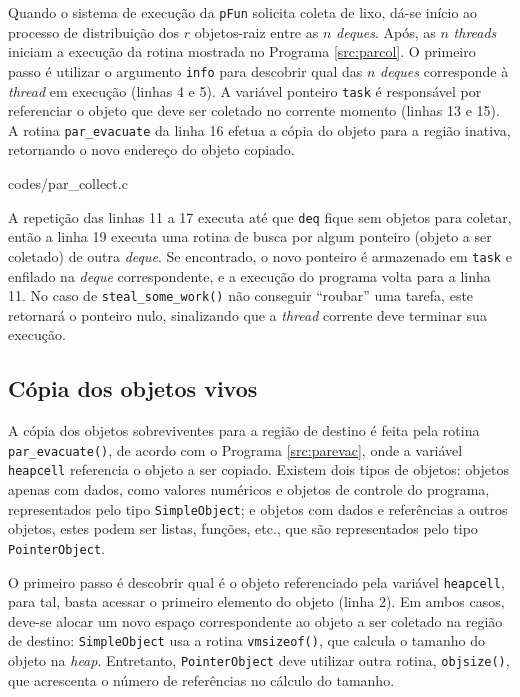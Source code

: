 \documentclass[ccc, pg2]{esinucpel}
\begin{document}
Quando o sistema de execução da {\tt pFun} solicita coleta de lixo, dá-se início ao processo de distribuição dos $r$ objetos-raiz entre as $n$ {\it deques}. Após, as $n$ {\it threads} iniciam a execução da rotina mostrada no Programa \ref{src:parcol}. O primeiro passo é utilizar o argumento {\tt info} para descobrir qual das $n$ {\it deques} corresponde à {\it thread} em execução (linhas 4 e 5). A variável ponteiro {\tt task} é responsável por referenciar o objeto que deve ser coletado no corrente momento (linhas 13 e 15). A rotina {\tt par\_evacuate} da linha 16 efetua a cópia do objeto para a região inativa, retornando o novo endereço do objeto copiado.


								 {codes/par_collect.c}

A repetição das linhas 11 a 17 executa até que {\tt deq} fique sem objetos para coletar, então a linha 19 executa uma rotina de busca por algum ponteiro (objeto a ser coletado) de outra {\it deque}. Se encontrado, o novo ponteiro é armazenado em {\tt task} e enfilado na {\it deque} correspondente, e a execução do programa volta para a linha 11. No caso de {\tt steal\_some\_work()} não conseguir ``roubar'' uma tarefa, este retornará o ponteiro nulo, sinalizando que a {\it thread} corrente deve terminar sua execução.


\subsection{Cópia dos objetos vivos}
A cópia dos objetos sobreviventes para a região de destino é feita pela rotina {\tt par\_evacuate()}, de acordo com o Programa \ref{src:parevac}, onde a variável {\tt heapcell} referencia o objeto a ser copiado. Existem dois tipos de objetos: objetos apenas com dados, como valores numéricos e objetos de controle do programa, representados pelo tipo {\tt SimpleObject}; e objetos com dados e referências a outros objetos, estes podem ser listas, funções, etc., que são representados pelo tipo {\tt PointerObject}.

O primeiro passo é descobrir qual é o objeto referenciado pela variável {\tt heapcell}, para tal, basta acessar o primeiro elemento do objeto (linha 2). Em ambos casos, deve-se alocar um novo espaço correspondente ao objeto a ser coletado na região de destino: {\tt SimpleObject} usa a rotina {\tt vmsizeof()}, que calcula o tamanho do objeto na {\it heap}. Entretanto, {\tt PointerObject} deve utilizar outra rotina, {\tt objsize()}, que acrescenta o número de referências no cálculo do tamanho.
\end{document}
